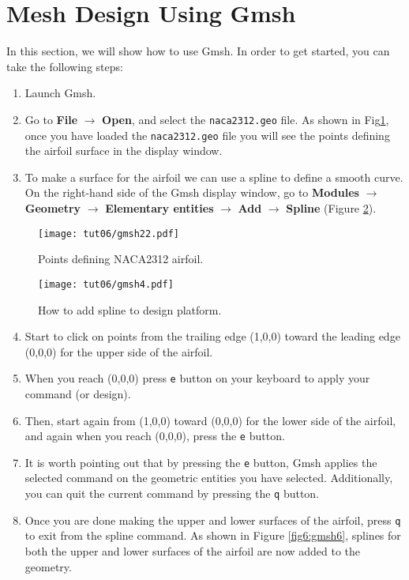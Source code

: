 \section{Mesh Design Using Gmsh}
In this section, we will show how to use Gmsh. In order to get started, you can take the following steps:
\begin{enumerate}[label=\arabic*)]
	\setcounter{enumi}{0}
	\item Launch Gmsh.
	\item Go to \textbf{File} $\rightarrow$ \textbf{Open}, and select the \texttt{naca2312.geo} file. As shown in Fig\ref{fig6:gmsh22}, once you have loaded the \texttt{naca2312.geo} file you will see the points defining the airfoil surface in the display window.	
	\item To make a surface for the airfoil we can use a spline to define a smooth curve. On the right-hand side of the Gmsh display window, go to \textbf{Modules} $\rightarrow$ \textbf{Geometry} $\rightarrow$ \textbf{Elementary entities} $\rightarrow$ \textbf{Add} $\rightarrow$ \textbf{Spline} (Figure \ref{fig6:gmsh4}).
\end{enumerate}
\begin{figure}[ht]
    \centering
    \texttt{[image: tut06/gmsh22.pdf]}
    \caption{Points defining NACA2312 airfoil.}
    \label{fig6:gmsh22}
\end{figure}
\begin{figure}[ht]
    \centering
    \texttt{[image: tut06/gmsh4.pdf]}
    \caption{How to add spline to design platform.}
    \label{fig6:gmsh4}
\end{figure}
\begin{enumerate}[label=\arabic*)]
	\setcounter{enumi}{3}
	\item Start to click on points from the trailing edge (1,0,0) toward the leading edge (0,0,0) for the upper side of the airfoil.
	\item When you reach (0,0,0) press \texttt{e} button on your keyboard to apply your command (or design).
	\item Then, start again from (1,0,0) toward (0,0,0) for the lower side of the airfoil, and again when you reach (0,0,0), press the \texttt{e} button.
	\item It is worth pointing out that by pressing the \texttt{e} button, Gmsh applies the selected command on the geometric entities you have selected. Additionally, you can quit the current command by pressing the \texttt{q} button.
	\item Once you are done making the upper and lower surfaces of the airfoil, press \texttt{q} to exit from the spline command. As shown in Figure \ref{fig6:gmsh6}, splines for both the upper and lower surfaces of the airfoil are now added to the geometry.	
\end{enumerate}
